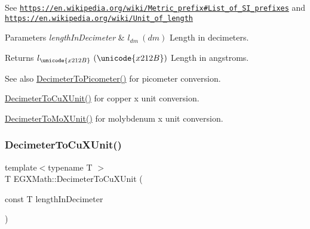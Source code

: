 See \href{https://en.wikipedia.org/wiki/Metric_prefix#List_of_SI_prefixes}{\tt https\+://en.\+wikipedia.\+org/wiki/\+Metric\+\_\+prefix\#\+List\+\_\+of\+\_\+\+S\+I\+\_\+prefixes} and \href{https://en.wikipedia.org/wiki/Unit_of_length}{\tt https\+://en.\+wikipedia.\+org/wiki/\+Unit\+\_\+of\+\_\+length} 
\begin{DoxyParams}{Parameters}
{\em length\+In\+Decimeter} & $ l_{dm}\ (dm)$ Length in decimeters. \\
\hline
\end{DoxyParams}
\begin{DoxyReturn}{Returns}
$ l_{\unicode{x212B}}\ (\unicode{x212B})$ Length in angstroms. 
\end{DoxyReturn}
\begin{DoxySeeAlso}{See also}
\mbox{\hyperlink{group___e_g_x_math-_conversions-_length_conversions-_decimeter-_s_i_gaac5fa4b7b538abe2d19f33e131e9bbde}{Decimeter\+To\+Picometer()}} for picometer conversion. 

\mbox{\hyperlink{group___e_g_x_math-_conversions-_length_conversions-_decimeter-_non-_s_i_gab595b2398e8e838922b4591308466e87}{Decimeter\+To\+Cu\+X\+Unit()}} for copper x unit conversion. 

\mbox{\hyperlink{group___e_g_x_math-_conversions-_length_conversions-_decimeter-_non-_s_i_ga609f53e09c9a767639da3ad72905bb71}{Decimeter\+To\+Mo\+X\+Unit()}} for molybdenum x unit conversion. 
\end{DoxySeeAlso}
\mbox{\label{group___e_g_x_math-_conversions-_length_conversions-_decimeter-_non-_s_i_gab595b2398e8e838922b4591308466e87}} 
\subsubsection{\texorpdfstring{Decimeter\+To\+Cu\+X\+Unit()}{DecimeterToCuXUnit()}}
{\footnotesize\ttfamily template$<$typename T $>$ \\
T E\+G\+X\+Math\+::\+Decimeter\+To\+Cu\+X\+Unit (\begin{DoxyParamCaption}\item[{const T}]{length\+In\+Decimeter }\end{DoxyParamCaption})}



